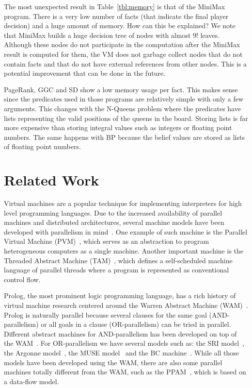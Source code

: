 \documentclass{sigplanconf}
\begin{document}
The most unexpected result in Table~\ref{tbl:memory} is that of the MiniMax program. There is a
very low number of facts (that indicate the final player decision) and a huge
amount of memory. How can this be explained? We note that MiniMax builds a huge
decision tree of nodes with almost $9!$ leaves. Although these nodes do not participate
in the computation after the MiniMax result is computed for them, the VM does not garbage collect
nodes that do not contain facts and that do not have external references from other nodes.
This is a potential improvement that can be done in the future.

PageRank, GGC and SD show a low memory usage per fact. This makes sense since the predicates
used in those programs are relatively simple with only a few arguments.
This changes with the N-Queens problem where the predicates have lists representing the valid
positions of the queens in the board. Storing lists is far more expensive than storing integral
values such as integers or floating point numbers. The same happens with BP because
the belief values are stored as lists of floating point numbers.
 
\makeatletter{}\section{Related Work}
\label{related_work}

Virtual machines are a popular technique for implementing interpreters
for high level programming languages.  Due to the increased
availability of parallel machines and distributed architectures,
several machine models have been developed with parallelism in
mind~\cite{Kara:1997:AMM:265274}.  One example of such machine is the
Parallel Virtual Machine (PVM)~\cite{Sunderam90pvm:a}, which serves as
an abstraction to program heterogeneous computers as a single
machine. Another important machine is the Threaded Abstract Machine
(TAM)~\cite{CullerGSvE93,goldstein-tr94}, which defines a
self-scheduled machine language of parallel threads where a program is
represented as conventional control flow.

Prolog, the most prominent logic programming language, has a rich
history of virtual machine research centered around the Warren
Abstract Machine (WAM)~\cite{AICPub641:1983}. 
Prolog is naturally parallel because several clauses for the same goal
(AND-parallelism) or all goals in a clause (OR-parallelism) can be
tried in parallel. Different abstract machines for AND-parallelism has
been developed on top of the
WAM~\cite{Hermenegildo:1986:AMB:913061,Lin:1988:AEL:900478}.  For
OR-parallelism we have several models such as: the SRI
model~\cite{Warren:1987:OEM:67683.67699}, the Argonne
model~\cite{ButlerDLOOS88}, the MUSE model~\cite{Ali:1990fk} and the
BC machine~\cite{Ali88}. While all those models have been developed
using the WAM, there are also some parallel machines totally different
from the WAM, such as the PPAM~\cite{Kacsuk:1990:EMP:533578}, which is
based on a data-flow model.
\end{document}
